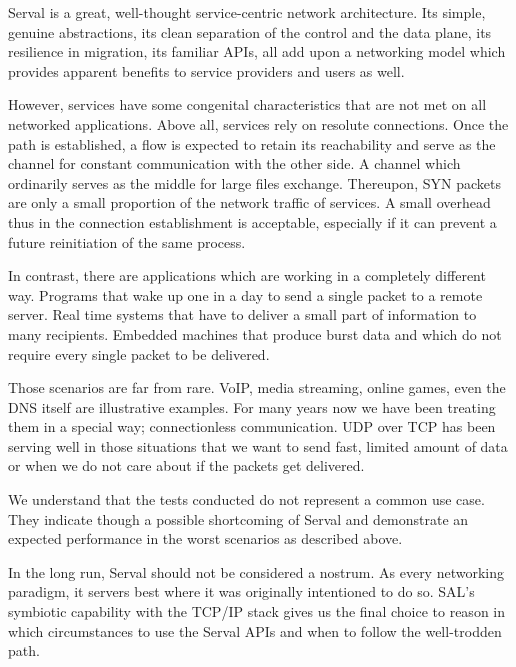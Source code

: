 Serval is a great, well-thought service-centric network architecture.
Its simple, genuine abstractions, its clean separation of the control and the data plane, its resilience in migration, its familiar APIs, all add upon a networking model which provides apparent benefits to service providers and users as well.

However, services have some congenital characteristics that are not met on all networked applications.
Above all, services rely on resolute connections.
Once the path is established, a flow is expected to retain its reachability and serve as the channel for constant communication with the other side.
A channel which ordinarily serves as the middle for large files exchange.
Thereupon, SYN packets are only a small proportion of the network traffic of services.
A small overhead thus in the connection establishment is acceptable, especially if it can prevent a future reinitiation of the same process.

In contrast, there are applications which are working in a completely different way.
Programs that wake up one in a day to send a single packet to a remote server.
Real time systems that have to deliver a small part of information to many recipients.
Embedded machines that produce burst data and which do not require every single packet to be delivered.

Those scenarios are far from rare.
VoIP,  media streaming, online games, even the DNS itself are illustrative examples.
For many years now we have been treating them in a special way; connectionless communication.
UDP over TCP has been serving well in those situations that we want to send fast, limited amount of data or when we do not care about if the packets get delivered.

We understand that the tests conducted do not represent a common use case.
They indicate though a possible shortcoming of Serval and demonstrate an expected performance in the worst scenarios as described above.

In the long run, Serval should not be considered a nostrum.
As every networking paradigm, it servers best where it was originally intentioned to do so.
SAL's symbiotic capability with the TCP/IP stack gives us the final choice to reason in which circumstances to use the Serval APIs and when to follow the well-trodden path.